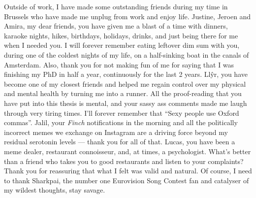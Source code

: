 Outside of work, I have made some outstanding friends during my time in Brussels who have made me unplug from work and enjoy life. Justine, Jeroen and Amira, my dear friends, you have given me a blast of a time with dinners, karaoke nights, hikes, birthdays, holidays, drinks, and just being there for me when I needed you. I will forever remember eating leftover dim sum with you, during one of the coldest nights of my life, on a half-sinking boat in the canals of Amsterdam. Also, thank you for not making fun of me for saying that I was finishing my PhD in half a year, continuously for the last 2 years. Llŷr, you have become one of my closest friends and helped me regain control over my physical and mental health by turning me into a runner. All the proof-reading that you have put into this thesis is mental, and your sassy ass comments made me laugh through very tiring times. I'll forever remember that ``Sexy people use Oxford commas''. Jalil, your \textit{Finch} notifications in the morning and all the politically incorrect memes we exchange on Instagram are a driving force beyond my residual serotonin levels --- thank you for all of that. Lucas, you have been a meme dealer, restaurant connoisseur, and, at times, a psychologist. What's better than a friend who takes you to good restaurants and listen to your complaints? Thank you for reassuring that what I felt was valid and natural. Of course, I need to thank Sharkpai, the number one Eurovision Song Contest fan and catalyser of my wildest thoughts, stay savage.

